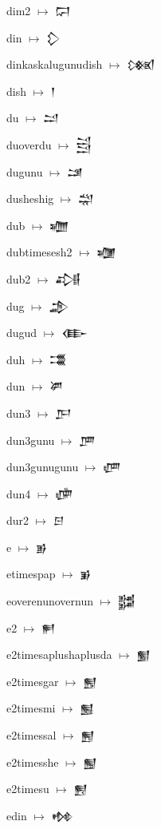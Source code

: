 {\noindent dim2 $\mapsto$ {\cufont 𒁶}\par
\noindent din $\mapsto$ {\cufont 𒁷}\par
\noindent dinkaskalugunudish $\mapsto$ {\cufont 𒁸}\par
\noindent dish $\mapsto$ {\cufont 𒁹}\par
\noindent du $\mapsto$ {\cufont 𒁺}\par
\noindent duoverdu $\mapsto$ {\cufont 𒁻}\par
\noindent dugunu $\mapsto$ {\cufont 𒁼}\par
\noindent dusheshig $\mapsto$ {\cufont 𒁽}\par
\noindent dub $\mapsto$ {\cufont 𒁾}\par
\noindent dubtimesesh2 $\mapsto$ {\cufont 𒁿}\par
\noindent dub2 $\mapsto$ {\cufont 𒂀}\par
\noindent dug $\mapsto$ {\cufont 𒂁}\par
\noindent dugud $\mapsto$ {\cufont 𒂂}\par
\noindent duh $\mapsto$ {\cufont 𒂃}\par
\noindent dun $\mapsto$ {\cufont 𒂄}\par
\noindent dun3 $\mapsto$ {\cufont 𒂅}\par
\noindent dun3gunu $\mapsto$ {\cufont 𒂆}\par
\noindent dun3gunugunu $\mapsto$ {\cufont 𒂇}\par
\noindent dun4 $\mapsto$ {\cufont 𒂈}\par
\noindent dur2 $\mapsto$ {\cufont 𒂉}\par
\noindent e $\mapsto$ {\cufont 𒂊}\par
\noindent etimespap $\mapsto$ {\cufont 𒂋}\par
\noindent eoverenunovernun $\mapsto$ {\cufont 𒂌}\par
\noindent e2 $\mapsto$ {\cufont 𒂍}\par
\noindent e2timesaplushaplusda $\mapsto$ {\cufont 𒂎}\par
\noindent e2timesgar $\mapsto$ {\cufont 𒂏}\par
\noindent e2timesmi $\mapsto$ {\cufont 𒂐}\par
\noindent e2timessal $\mapsto$ {\cufont 𒂑}\par
\noindent e2timesshe $\mapsto$ {\cufont 𒂒}\par
\noindent e2timesu $\mapsto$ {\cufont 𒂓}\par
\noindent edin $\mapsto$ {\cufont 𒂔}\par
}
